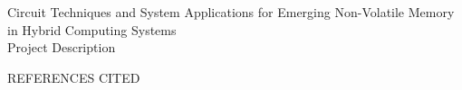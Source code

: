 \documentclass[11pt,letterpaper]{article}
\begin{document}
\vspace*{-0.5\baselineskip} \vspace*{-\baselineskip}

\thispagestyle{empty}

%
\setcounter{page}{1}

\begin{center}
{\Large Circuit Techniques and System Applications for Emerging Non-Volatile Memory in Hybrid Computing Systems}\\
\vspace*{0.75\baselineskip}
{\Large Project Description}\\
\end{center}








\pagebreak

\setcounter{page}{1} \pagebreak
\begin{center}
{\Large  REFERENCES CITED} \\
\end{center}
\setlength{\itemsep}{0pt} \setlength{\parskip}{0pt}


%




%
\end{document}
